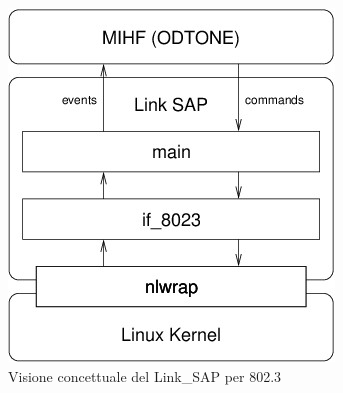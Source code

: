 \begin{figure}[h!]
\centering
\includegraphics[scale=0.8]{sap.jpg}
\caption{Visione concettuale del Link\_SAP per 802.3}
\label{fig:sap3}
\end{figure}


